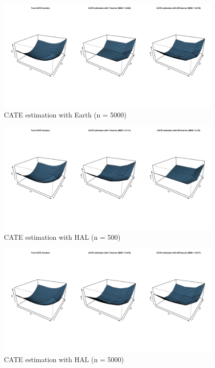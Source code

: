 \documentclass[
]{article}
\begin{document}
\begin{figure}[H]

{\centering \includegraphics[width=1\linewidth]{cate_5000} 

}

\caption{CATE estimation with Earth (n = 5000)}\label{fig:unnamed-chunk-22}
\end{figure}

\begin{figure}[H]

{\centering \includegraphics[width=1\linewidth]{cate_500_hal} 

}

\caption{CATE estimation with HAL (n = 500)}\label{fig:unnamed-chunk-23}
\end{figure}

\begin{figure}[H]

{\centering \includegraphics[width=1\linewidth]{cate_5000_hal} 

}

\caption{CATE estimation with HAL (n = 5000)}\label{fig:unnamed-chunk-24}
\end{figure}
\end{document}
